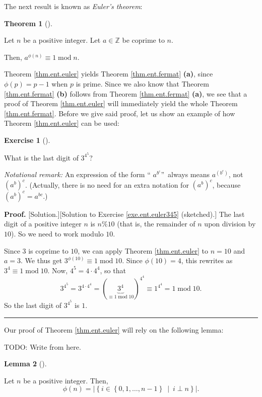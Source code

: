 \documentclass[numbers=enddot,12pt,final,onecolumn,notitlepage]{scrartcl}%
\newcounter{exer}
\numberwithin{exer}{subsection}
\theoremstyle{definition}
\newtheorem{theo}{Theorem}[subsection]
\newenvironment{theorem}[1][]
{\begin{theo}[#1]\begin{leftbar}}
{\end{leftbar}\end{theo}}
\newtheorem{lem}[theo]{Lemma}
\newenvironment{lemma}[1][]
{\begin{lem}[#1]\begin{leftbar}}
{\end{leftbar}\end{lem}}
\newtheorem{exmp}[exer]{Exercise}
\newenvironment{exercise}[1][]
{\begin{exmp}[#1]\begin{leftbar}}
{\end{leftbar}\end{exmp}}
\newenvironment{proof}[1][Proof]{\noindent\textbf{#1.} }{\ \rule{0.5em}{0.5em}}
\begin{document}
The next result is known as \textit{Euler's theorem}:

\begin{theorem}
\label{thm.ent.euler}Let $n$ be a positive integer. Let $a\in\mathbb{Z}$ be
coprime to $n$.

Then, $a^{\phi\left(  n\right)  }\equiv1\operatorname{mod}n$.
\end{theorem}

Theorem \ref{thm.ent.euler} yields Theorem \ref{thm.ent.fermat} \textbf{(a)},
since $\phi\left(  p\right)  =p-1$ when $p$ is prime. Since we also know that
Theorem \ref{thm.ent.fermat} \textbf{(b)} follows from Theorem
\ref{thm.ent.fermat} \textbf{(a)}, we see that a proof of Theorem
\ref{thm.ent.euler} will immediately yield the whole Theorem
\ref{thm.ent.fermat}. Before we give said proof, let us show an example of how
Theorem \ref{thm.ent.euler} can be used:

\begin{exercise}
\label{exe.ent.euler345}What is the last digit of $3^{4^{5}}$?

\textit{Notational remark:} An expression of the form \textquotedblleft%
$a^{b^{c}}$\textquotedblright\ always means $a^{\left(  b^{c}\right)  }$, not
$\left(  a^{b}\right)  ^{c}$. (Actually, there is no need for an extra
notation for $\left(  a^{b}\right)  ^{c}$, because $\left(  a^{b}\right)
^{c}=a^{bc}$.)
\end{exercise}

\begin{proof}
[Solution.][Solution to Exercise \ref{exe.ent.euler345} (sketched).] The last
digit of a positive integer $n$ is $n\%10$ (that is, the remainder of $n$ upon
division by $10$). So we need to work modulo $10$.

Since $3$ is coprime to $10$, we can apply Theorem \ref{thm.ent.euler} to
$n=10$ and $a=3$. We thus get $3^{\phi\left(  10\right)  }\equiv
1\operatorname{mod}10$. Since $\phi\left(  10\right)  =4$, this rewrites as
$3^{4}\equiv1\operatorname{mod}10$. Now, $4^{5}=4\cdot4^{4}$, so that%
\[
3^{4^{5}}=3^{4\cdot4^{4}}=\left(  \underbrace{3^{4}}_{\equiv
1\operatorname{mod}10}\right)  ^{4^{4}}\equiv1^{4^{4}}=1\operatorname{mod}10.
\]
So the last digit of $3^{4^{5}}$ is $1$.
\end{proof}

Our proof of Theorem \ref{thm.ent.euler} will rely on the following lemma:

TODO: Write from here.

\begin{lemma}
\label{lem.ent.euler.phi0}Let $n$ be a positive integer. Then,%
\[
\phi\left(  n\right)  =\left\vert \left\{  i\in\left\{  0,1,\ldots
,n-1\right\}  \ \mid\ i\perp n\right\}  \right\vert .
\]

\end{lemma}
\end{document}
